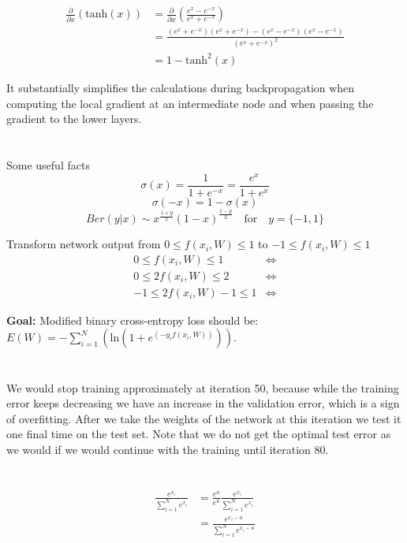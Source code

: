 \documentclass[11pt]{article}
\newcommand{\exercise}{\section{}}
\newcommand{\sumf}[3]{\sum_{#1}^{#2} #3}
\newcommand{\partialf}[1]{\frac{\partial}{{\partial #1}}}
\begin{document}
\exercise



\exercise

\exercise

\begin{align*}
\partialf{x}(\text{tanh}(x)) &= \partialf{x}(\frac{e^x - e^{-x}}{e^x + e^{-x}}) \\
&= \frac{ ( e^x + e^{-x} )( e^x + e^{-x}) - ( e^x - e^{-x} )( e^x - e^{-x} )}{ ( e^x + e^{-x} )^2 } \\
&= 1 - \text{tanh}^2(x)
\end{align*}

It substantially simplifies the calculations during backpropagation when computing the local gradient at an intermediate node and when passing the gradient to the lower layers.

\exercise
Some useful facts
$$\sigma(x) = \frac{1}{1 + e^{-x}} = \frac{e^x}{1 + e^{x}} $$
$$\sigma(-x) = 1 - \sigma(x)$$
$$Ber(y | x ) \sim x^{\frac{1 + y}{2}} (1 - x)^{\frac{1 - y}{2}} \quad \text{for} \quad y = \{-1, 1 \} $$


\noindent Transform network output from $0 \leq f(x_i, W) \leq 1$ to $-1 \leq f(x_i, W) \leq 1$
\begin{align*}
0 \leq f(x_i, W) \leq 1 &\Leftrightarrow \\
0 \leq 2f(x_i, W) \leq 2 &\Leftrightarrow  \\
-1 \leq 2f(x_i, W) - 1 \leq 1 &\Leftrightarrow 
\end{align*}

\noindent \textbf{Goal:} Modified binary cross-entropy loss should be: $E(W) = - \sumf{i=1}{N}{(\text{ln}(1 + e^{(-y_i f(x_i, W))}))}$.


\exercise

\exercise

We would stop training approximately at iteration 50, because while the training error keeps decreasing we have an increase in the validation error, which is a sign of overfitting. After we take the weights of the network at this iteration we test it one final time on the test set. Note that we do not get the optimal test error as we would if we would continue with the training until iteration 80.

\exercise

\exercise

\begin{align*}
\frac{e^{x_i}}{\sumf{i=1}{N}{e^{x_i}}} &= \frac{e^{a}}{e^{a}} \frac{e^{x_i}}{\sumf{i=1}{N}{e^{x_i}}} \\
&= \frac{e^{x_i - a}}{\sumf{i=1}{N}{e^{x_i - a}}}
\end{align*}
\end{document}
